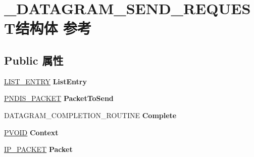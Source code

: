 \hypertarget{struct___d_a_t_a_g_r_a_m___s_e_n_d___r_e_q_u_e_s_t}{}\section{\+\_\+\+D\+A\+T\+A\+G\+R\+A\+M\+\_\+\+S\+E\+N\+D\+\_\+\+R\+E\+Q\+U\+E\+S\+T结构体 参考}
\label{struct___d_a_t_a_g_r_a_m___s_e_n_d___r_e_q_u_e_s_t}
\subsection*{Public 属性}
\begin{DoxyCompactItemize}
\item 
\mbox{\label{struct___d_a_t_a_g_r_a_m___s_e_n_d___r_e_q_u_e_s_t_aca6cf79cb09f0602368bebad1bae3ebd}} 
\hyperlink{struct___l_i_s_t___e_n_t_r_y}{L\+I\+S\+T\+\_\+\+E\+N\+T\+RY} {\bfseries List\+Entry}
\item 
\mbox{\label{struct___d_a_t_a_g_r_a_m___s_e_n_d___r_e_q_u_e_s_t_ad1a2b8cd91870fca69293ab7d1d4c2b7}} 
\hyperlink{struct___n_d_i_s___p_a_c_k_e_t}{P\+N\+D\+I\+S\+\_\+\+P\+A\+C\+K\+ET} {\bfseries Packet\+To\+Send}
\item 
\mbox{\label{struct___d_a_t_a_g_r_a_m___s_e_n_d___r_e_q_u_e_s_t_a9ab8e39c1b7894dbe13928ed38d055e7}} 
D\+A\+T\+A\+G\+R\+A\+M\+\_\+\+C\+O\+M\+P\+L\+E\+T\+I\+O\+N\+\_\+\+R\+O\+U\+T\+I\+NE {\bfseries Complete}
\item 
\mbox{\label{struct___d_a_t_a_g_r_a_m___s_e_n_d___r_e_q_u_e_s_t_ad63f53606de988a20024ecc5f7bfd889}} 
\hyperlink{interfacevoid}{P\+V\+O\+ID} {\bfseries Context}
\item 
\mbox{\label{struct___d_a_t_a_g_r_a_m___s_e_n_d___r_e_q_u_e_s_t_a4e515f9907f29f272cd7f5ae2103a862}} 
\hyperlink{struct___i_p___p_a_c_k_e_t}{I\+P\+\_\+\+P\+A\+C\+K\+ET} {\bfseries Packet}
\item 
\mbox{\label{struct___d_a_t_a_g_r_a_m___s_e_n_d___r_e_q_u_e_s_t_a4502efb5dbd1281d60fb5ce8721a8a44}} 

\end{DoxyCompactItemize}
